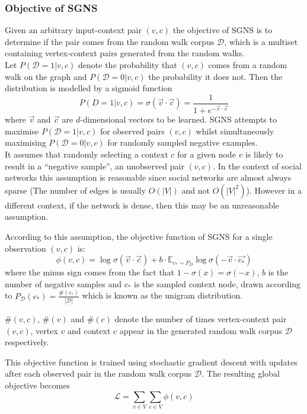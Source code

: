 \documentclass[a4paper]{article}
\renewcommand{\E}{\mathbb E}
\newcommand{\D}{\mathcal D}
\begin{document}
\subsubsection{Objective of SGNS}
Given an arbitrary input-context pair $(v,c)$ the objective of SGNS is to determine if
the pair comes from the random walk corpus $\mathcal{D}$, which is a multiset containing vertex-context pairs generated from the random walks.\\
Let $P(\D = 1 | v, c)$ denote the probability that $(v,c)$ comes from a random
walk on the graph and $P(\D = 0| v, c)$
the probability it does not. Then the distribution is modelled by a sigmoid
function
\[P(D = 1 | v, c) = \sigma(\vec{v} \cdot \vec{c}) = \frac{1}{1 + e^{-\vec{v} \cdot \vec{c}}}\]
where $\vec{v}$ and $\vec{c}$ are $d$-dimensional vectors to be learned. SGNS attempts to maximise $P(\mathcal{D} = 1 | v,c)$ for observed pairs $(v, c)$
whilst simultaneously maximising $P(\D = 0 | v, c)$ for randomly sampled
negative examples.\\
It assumes that randomly selecting a context $c$ for a given
node $v$ is likely to result in a ``negative sample'', an unobserved pair $(v,c)$. In the context of
social networks this assumption is reasonable since social networks are almost
always sparse (The number of edges is usually $O(|V|)$ and not $O(|V|^2)$). However in a different
context, if the network is dense, then this may be an unreasonable assumption.

According to this assumption, the objective function of SGNS for a single
observation $(v,c)$ is:
\[\phi(v, c) = \log{\sigma(\vec{v} \cdot \vec{c})} + b \cdot \E_{c_* \sim P_D}\log{\sigma(-\vec{v} \cdot \vec{c_*})}\]
where the minus sign comes from the fact that $1 - \sigma(x) = \sigma(-x)$, $b$
is the number of negative samples and $c_*$ is the sampled context node, drawn
according to $P_{\D} (c_*) = \frac{\#(c_*)}{| \D |}$ which is known as the unigram
distribution.\\
\begin{notation} $\#(v,c)$, $\#(v)$ and $\#(c)$ denote the number of times vertex-context pair
  $(v,c)$, vertex $v$ and context $c$ appear in the generated random walk corpus
  $\mathcal{D}$ respectively.
\end{notation}
\noindent This objective function is trained using stochastic gradient descent with
updates after each  observed pair in the random walk corpus $\D$. The resulting
global objective becomes
\begin{equation*}
  \mathcal{L} = \sum_{v \in V} \sum_{c \in V} \phi(v, c)
\end{equation*}
\end{document}
